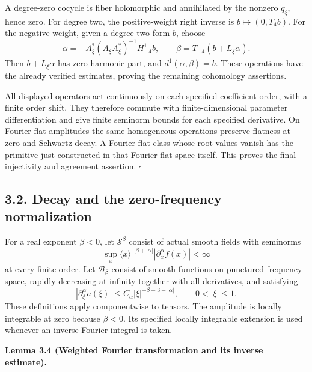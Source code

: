 \documentclass[
  english,
  11pt,
  reqno]{amsart}
\makeatletter
\newcommand{\pandocstatementheading}[1]{%
  \par\if@nobreak\else
    \addpenalty{\@beginparpenalty}%
    \addvspace{.5\baselineskip plus .2\baselineskip minus .2\baselineskip}%
  \fi
  {\normalfont\bfseries #1\par}%
  \nobreak\@afterindenttrue\@afterheading
}
\makeatother
\begin{document}
A degree-zero cocycle is fiber holomorphic and annihilated by the
nonzero \(q_\xi\), hence zero. For degree two, the positive-weight right
inverse is \(b\mapsto(0,T_4b)\). For the negative weight, given a
degree-two form \(b\), choose \[
\alpha=-A_\xi^*(A_\xi A_\xi^*)^{-1}H_{-4}^1b,
\qquad
\beta=T_{-4}(b+L_\xi\alpha).
\] Then \(b+L_\xi\alpha\) has zero harmonic part, and
\(d^1(\alpha,\beta)=b\). These operations have the already verified
estimates, proving the remaining cohomology assertions.

All displayed operators act continuously on each specified coefficient
order, with a finite order shift. They therefore commute with
finite-dimensional parameter differentiation and give finite seminorm
bounds for each specified derivative. On Fourier-flat amplitudes the
same homogeneous operations preserve flatness at zero and Schwartz
decay. A Fourier-flat class whose root values vanish has the primitive
just constructed in that Fourier-flat space itself. This proves the
final injectivity and agreement assertion. \hfill\(\square\)

\subsection{3.2. Decay and the zero-frequency
normalization}\label{decay-and-the-zero-frequency-normalization}\label{sec:online-root-weighted-fourier}

For a real exponent \(\beta<0\), let \(\mathscr S^\beta\) consist of
actual smooth fields with seminorms \[
\sup_x\langle x\rangle^{-\beta+|\alpha|}
|\partial_x^\alpha f(x)|<\infty
\] at every finite order. Let \(\mathscr B_\beta\) consist of smooth
functions on punctured frequency space, rapidly decreasing at infinity
together with all derivatives, and satisfying%
 \[
|\partial_\xi^\alpha a(\xi)|
\le C_\alpha|\xi|^{-\beta-3-|\alpha|},
\qquad 0<|\xi|\le1.
\] These definitions apply componentwise to tensors. The amplitude is
locally integrable at zero because \(\beta<0\). Its specified locally
integrable extension is used whenever an inverse Fourier integral is
taken.

\pandocstatementheading{\leavevmode{}\label{lem:online-decay-fourier-isomorphism}Lemma 3.4 (Weighted Fourier transformation and its inverse estimate).}
\end{document}
